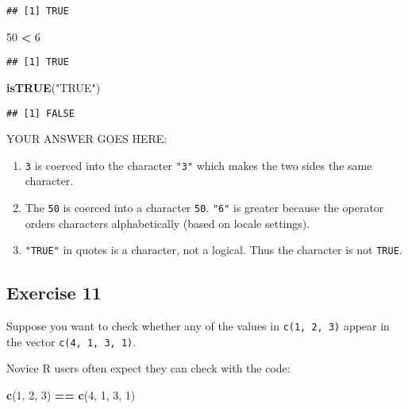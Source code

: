 \documentclass[
]{article}
\newenvironment{Shaded}{\begin{snugshade}}{\end{snugshade}}
\newcommand{\DecValTok}[1]{\textcolor[rgb]{0.00,0.00,0.81}{#1}}
\newcommand{\KeywordTok}[1]{\textcolor[rgb]{0.13,0.29,0.53}{\textbf{#1}}}
\newcommand{\NormalTok}[1]{#1}
\newcommand{\OperatorTok}[1]{\textcolor[rgb]{0.81,0.36,0.00}{\textbf{#1}}}
\newcommand{\StringTok}[1]{\textcolor[rgb]{0.31,0.60,0.02}{#1}}
\providecommand{\tightlist}{%
  \setlength{\itemsep}{0pt}\setlength{\parskip}{0pt}}
\begin{document}
\begin{verbatim}
## [1] TRUE
\end{verbatim}

\begin{Shaded}
\begin{Highlighting}[]
\DecValTok{50} \OperatorTok{\textless{}}\StringTok{ \textquotesingle{}6\textquotesingle{}}
\end{Highlighting}
\end{Shaded}

\begin{verbatim}
## [1] TRUE
\end{verbatim}

\begin{Shaded}
\begin{Highlighting}[]
\KeywordTok{isTRUE}\NormalTok{(}\StringTok{"TRUE"}\NormalTok{)}
\end{Highlighting}
\end{Shaded}

\begin{verbatim}
## [1] FALSE
\end{verbatim}

YOUR ANSWER GOES HERE:

\begin{enumerate}
\def\labelenumi{\arabic{enumi}.}
\tightlist
\item
  \texttt{3} is coerced into the character \texttt{"3"} which makes the
  two sides the same character.
\item
  The \texttt{50} is coerced into a character \texttt{50}. \texttt{"6"}
  is greater because the operator orders characters alphabetically
  (based on locale settings).
\item
  \texttt{"TRUE"} in quotes is a character, not a logical. Thus the
  character is not \texttt{TRUE}.
\end{enumerate}

\hypertarget{exercise-11}{%
\subsection{Exercise 11}\label{exercise-11}}

Suppose you want to check whether any of the values in
\texttt{c(1,\ 2,\ 3)} appear in the vector \texttt{c(4,\ 1,\ 3,\ 1)}.

Novice R users often expect they can check with the code:

\begin{Shaded}
\begin{Highlighting}[]
\KeywordTok{c}\NormalTok{(}\DecValTok{1}\NormalTok{, }\DecValTok{2}\NormalTok{, }\DecValTok{3}\NormalTok{) }\OperatorTok{==}\StringTok{ }\KeywordTok{c}\NormalTok{(}\DecValTok{4}\NormalTok{, }\DecValTok{1}\NormalTok{, }\DecValTok{3}\NormalTok{, }\DecValTok{1}\NormalTok{)}
\end{Highlighting}
\end{Shaded}
\end{document}
